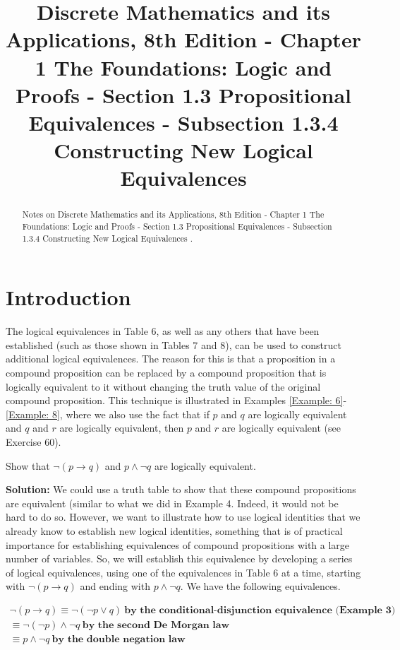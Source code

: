 \documentclass{Axon}
\title{Discrete Mathematics and its Applications, 8th Edition - Chapter 1 The Foundations: Logic and Proofs - Section 1.3 Propositional Equivalences - Subsection 1.3.4 Constructing New Logical Equivalences}
\begin{document}
\maketitle
\makeauthor
\begin{abstract}
Notes on Discrete Mathematics and its Applications, 8th Edition - Chapter 1 The Foundations: Logic and Proofs - Section 1.3 Propositional Equivalences - Subsection 1.3.4 Constructing New Logical Equivalences \cite{Rosen}.
\end{abstract}
\section{Introduction}
The logical equivalences in Table 6, as well as any others that have been established (such as those shown in Tables 7 and 8), can be used to construct additional logical equivalences. The reason for this is that a proposition in a compound proposition can be replaced by a compound proposition that is logically equivalent to it without changing the truth value of the original compound proposition. This technique is illustrated in Examples \ref{Example: 6}-\ref{Example: 8}, where we also use the fact that if \(p\) and \(q\) are logically equivalent and \(q\) and \(r\) are logically equivalent, then \(p\) and \(r\) are logically equivalent (see Exercise 60).

\begin{example}\label{Example: 6}
    Show that \(\lnot (p \to q)\) and \(p \land \lnot q\) are logically equivalent.

    \noindent
    \textbf{Solution:}
    We could use a truth table to show that these compound propositions are equivalent (similar to what we did in Example 4. Indeed, it would not be hard to do so. However, we want to illustrate how to use logical identities that we already know to establish new logical identities, something that is of practical importance for establishing equivalences of compound propositions with a large number of variables. So, we will establish this equivalence by developing a series of logical equivalences, using one of the equivalences in Table 6 at a time, starting with \(\lnot (p \to q)\) and ending with \(p \land \lnot q\). We have the following equivalences.

    \begin{gather*}
        \lnot (p \to q) \equiv \lnot(\lnot p \lor q) \ \textbf{by the conditional-disjunction equivalence (Example 3)} \\
        \equiv \lnot(\lnot p) \land \lnot q \ \textbf{by the second De Morgan law} \\
        \equiv p \land \lnot q \ \textbf{by the double negation law}
    \end{gather*}
\end{example}
\end{document}
